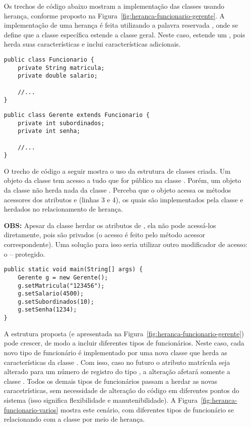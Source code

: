 Os trechos de código abaixo mostram a implementação das classes usando herança, conforme proposto na Figura~\ref{fig:heranca-funcionario-gerente}. A implementação de uma herança é feita utilizando a palavra reservada , onde se define que a classe específica estende a classe geral. Neste caso,  estende um , pois herda suas características e inclui características adicionais.

\begin{verbatim}
public class Funcionario {
	private String matricula;
	private double salario;
	
	//...
}
\end{verbatim}
 
\begin{verbatim}
public class Gerente extends Funcionario {
	private int subordinados;
	private int senha;
	
	//...
}
\end{verbatim}

O trecho de código a seguir mostra o uso da estrutura de classes criada. Um objeto da classe  tem acesso a tudo que for público na classe . Porém, um objeto da classe  não herda nada da classe . Perceba que o objeto  acessa os métodos acessores dos atributos  e  (linhas 3 e 4), os quais são implementados pela classe  e herdados no relacionamento de herança.

\textbf{OBS:} Apesar da classe  herdar os atributos de , ela não pode acessá-los diretamente, pois são privados (o acesso é feito pelo método acessor correspondente). Uma solução para isso seria utilizar outro modificador de acesso: o  -- protegido.

\begin{verbatim}
public static void main(String[] args) {
	Gerente g = new Gerente();
	g.setMatricula("123456");
	g.setSalario(4500);
	g.setSubordinados(10);
	g.setSenha(1234);
}
\end{verbatim}
 
A estrutura proposta (e apresentada na Figura~\ref{fig:heranca-funcionario-gerente}) pode crescer, de modo a incluir diferentes tipos de funcionários. Neste caso, cada novo tipo de funcionário é implementado por uma nova classe que herda as características da classe . Com isso, caso no futuro o atributo matrícula seja alterado para um número de registro do tipo , a alteração afetará somente a classe . Todos os demais tipos de funcionários passam a herdar as novas caracetrísticas, sem necessidade de alteração do código em diferentes pontos do sistema (isso significa flexibilidade e manutenibilidade). A Figura~\ref{fig:heranca-funcionario-varios} mostra este cenário, com diferentes tipos de funcionário se relacionando com a classe  por meio de herança.

